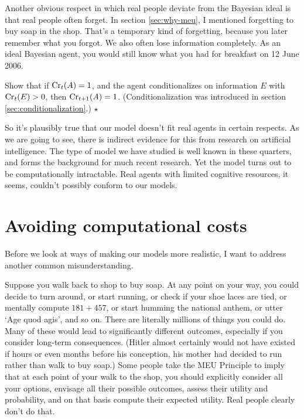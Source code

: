Another obvious respect in which real people deviate from the Bayesian
ideal is that real people often forget. In section \ref{sec:why-meu},
I mentioned forgetting to buy soap in the shop. That's a temporary
kind of forgetting, because you later remember what you forgot. We
also often lose information completely. As an ideal Bayesian agent,
you would still know what you had for breakfast on 12 June 2006.

\begin{exercise}
  Show that if $\text{Cr}_t(A) = 1$, and the agent conditionalizes on
  information $E$ with $\text{Cr}_t(E) > 0$, then $\text{Cr}_{t+1}(A) =
  1$. (Conditionalization was introduced in
  section \ref{sec:conditionalization}.) $\star$
\end{exercise}


So it's plausibly true that our model doesn't fit real agents in
certain respects. As we are going to see, there is indirect evidence
for this from research on artificial intelligence. The type of model
we have studied is well known in these quarters, and forms the
background for much recent research.%
Yet the model turns out to be computationally intractable. Real agents
with limited cognitive resources, it seems, couldn't possibly conform
to our models.


\section{Avoiding computational costs}

Before we look at ways of making our models more realistic, I want to
address another common misunderstanding.

Suppose you walk back to shop to buy soap. At any point on your way,
you could decide to turn around, or start running, or check if your shoe
laces are tied, or mentally compute $181 + 457$, or start humming the
national anthem, or utter `Age quod agis', and so on. There are
literally millions of things you could do. Many of these would lead to
significantly different outcomes, especially if you consider long-term
consequences. (Hitler almost certainly would not have existed if hours
or even months before his conception, his mother had decided to run
rather than walk to buy soap.) Some people take the MEU Principle to
imply that at each point of your walk to the shop, you should
explicitly consider all your options, envisage all their possible
outcomes, assess their utility and probability, and on that basis
compute their expected utility. Real people clearly don't do that.


